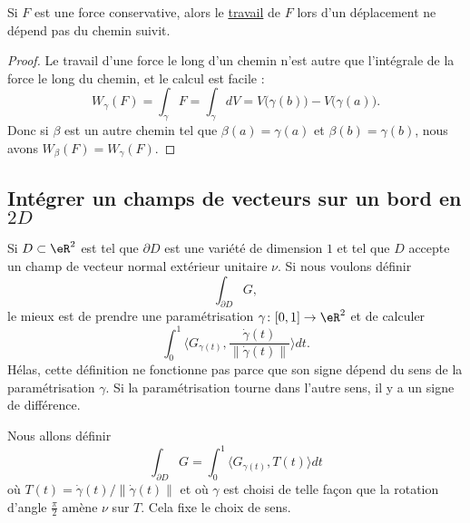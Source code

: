 \begin{proposition}
	Si $F$ est une force conservative, alors le \href{http://fr.wikipedia.org/wiki/Travail_d'une_force}{travail} de $F$ lors d'un déplacement ne dépend pas du chemin suivit.
\end{proposition}

\begin{proof}
	Le travail d'une force le long d'un chemin n'est autre que l'intégrale de la force le long du chemin, et le calcul est facile :
	\begin{equation}
		W_{\gamma}(F)=\int_{\gamma}F=\int_{\gamma}dV=V\big( \gamma(b) \big)-V\big( \gamma(a) \big).
	\end{equation}
	Donc si $\beta$ est un autre chemin tel que $\beta(a)=\gamma(a)$ et $\beta(b)=\gamma(b)$, nous avons $W_{\beta}(F)=W_{\gamma}(F)$.
\end{proof}

\subsection{Intégrer un champs de vecteurs sur un bord en \texorpdfstring{$ 2D$}{2D}}

Si $D\subset\eR^2$ est tel que $\partial D$ est une variété de dimension $1$ et tel que $D$ accepte un champ de vecteur normal extérieur unitaire $\nu$. Si nous voulons définir
\begin{equation}
	\int_{\partial D}G,
\end{equation}
le mieux est de prendre une paramétrisation $\gamma\colon \mathopen[ 0 , 1 \mathclose]\to \eR^2$ et de calculer
\begin{equation}
	\int_0^1 \langle G_{\gamma(t)}, \frac{ \dot\gamma(t) }{ \| \dot\gamma(t) \| }\rangle dt.
\end{equation}
Hélas, cette définition ne fonctionne pas parce que son signe dépend du sens de la paramétrisation $\gamma$. Si la paramétrisation tourne dans l'autre sens, il y a un signe de différence.

Nous allons définir
\begin{equation}		\label{EqIntVectbordDeux}
	\int_{\partial D}G=\int_0^1\langle G_{\gamma(t)}, T(t)\rangle dt
\end{equation}
où $T(t)=\dot\gamma(t)/\| \dot\gamma(t) \|$ et où $\gamma$ est choisi de telle façon que la rotation d'angle $\frac{ \pi }{ 2 }$ amène $\nu$ sur $T$. Cela fixe le choix de sens.

